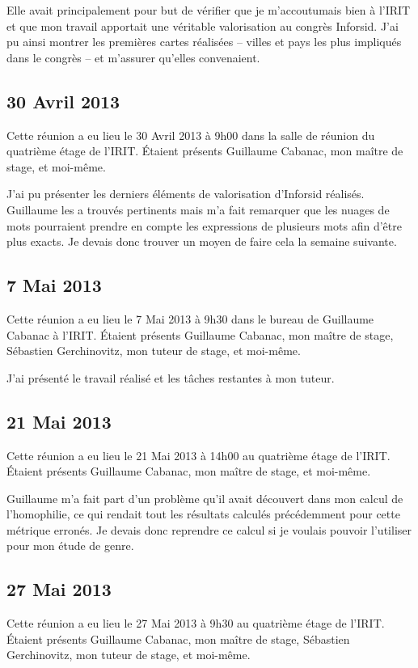 		Elle avait principalement pour but de vérifier que je m'accoutumais bien à l'IRIT et que mon travail apportait une véritable valorisation au congrès Inforsid. J'ai pu ainsi montrer les premières cartes réalisées -- villes et pays les plus impliqués dans le congrès -- et m'assurer qu'elles convenaient.
	
	
	\subsection{30 Avril 2013}
		Cette réunion a eu lieu le 30 Avril 2013 à 9h00 dans la salle de réunion du quatrième étage de l'IRIT. Étaient présents Guillaume Cabanac, mon maître de stage, et moi-même.
		
		J'ai pu présenter les derniers éléments de valorisation d'Inforsid réalisés. Guillaume les a trouvés pertinents mais m'a fait remarquer que les nuages de mots pourraient prendre en compte les expressions de plusieurs mots afin d'être plus exacts. Je devais donc trouver un moyen de faire cela la semaine suivante.
	
	
	\subsection{7 Mai 2013}
		Cette réunion a eu lieu le 7 Mai 2013 à 9h30 dans le bureau de Guillaume Cabanac à l'IRIT. Étaient présents Guillaume Cabanac, mon maître de stage, Sébastien Gerchinovitz, mon tuteur de stage, et moi-même.
		
		J'ai présenté le travail réalisé et les tâches restantes à mon tuteur.
	
	
	\subsection{21 Mai 2013}
		Cette réunion a eu lieu le 21 Mai 2013 à 14h00 au quatrième étage de l'IRIT. Étaient présents Guillaume Cabanac, mon maître de stage, et moi-même.
		
	Guillaume m'a fait part d'un problème qu'il avait découvert dans mon calcul de l'homophilie, ce qui rendait tout les résultats calculés précédemment pour cette métrique erronés. Je devais donc reprendre ce calcul si je voulais pouvoir l'utiliser pour mon étude de genre.
	
	
	\subsection{27 Mai 2013}
		Cette réunion a eu lieu le 27 Mai 2013 à 9h30 au quatrième étage de l'IRIT. Étaient présents Guillaume Cabanac, mon maître de stage, Sébastien Gerchinovitz, mon tuteur de stage, et moi-même.
		
